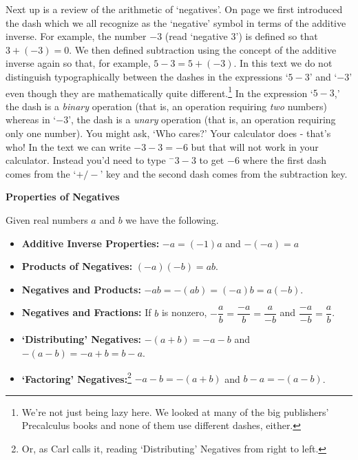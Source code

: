 \documentclass{ximera}
\begin{document}
Next up is a review of the arithmetic of `negatives'. On page \pageref{realnumberaddition} we first introduced the dash which we all recognize as the `negative' symbol in terms of the additive inverse.  For example, the number $-3$ (read `negative $3$') is defined so that $3 + (-3) = 0$.  We then defined subtraction using the concept of the additive inverse again so that, for example, $5 - 3 = 5 + (-3)$.  In this text we do not distinguish typographically between the dashes in the expressions `$5-3$' and `$-3$' even though they are mathematically quite different.\footnote{We're not just being lazy here.  We looked at many of the big publishers' Precalculus books and none of them use different dashes, either.} In the expression `$5-3$,' the dash is a \textit{binary} operation (that is, an operation requiring \textit{two} numbers) whereas in `$-3$', the dash is a \textit{unary} operation (that is, an operation requiring only one number).  You might ask, `Who cares?'  Your calculator does - that's who!  In the text we can write $-3 - 3 = -6$ but that will not work in your calculator.  Instead you'd need to type $^{-}3 - 3$ to get $-6$ where the first dash comes from the `$+/-$' key and the second dash comes from the subtraction key.

\medskip

\label{propertiesofnegatives}


\centerline{\textbf{Properties of Negatives}}
\smallskip
Given real numbers $a$ and $b$ we have the following.  

\begin{itemize}

\item  \textbf{Additive Inverse Properties:}  $-a = (-1)a$ and $-(-a) = a$

\item  \textbf{Products of Negatives:} $(-a)(-b) = ab$. 

\item  \textbf{Negatives and Products:} $-ab = -(ab) = (-a)b = a(-b)$.

\item  \textbf{Negatives and Fractions:} If $b$ is nonzero, $-\dfrac{a}{b} = \dfrac{-a}{b} = \dfrac{a}{-b}$ and $\dfrac{-a}{-b} = \dfrac{a}{b}$.

\item  \textbf{`Distributing' Negatives:}  $-(a+b) = -a-b$ and $-(a-b) = -a + b = b-a$.

\item  \textbf{`Factoring' Negatives:}\footnote{Or, as Carl calls it, reading `Distributing' Negatives from right to left.} $-a-b = -(a+b)$ and $b-a = -(a-b)$.

\end{itemize}
\end{document}

